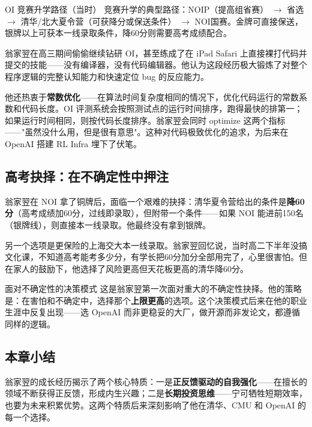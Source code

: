 \begin{knowledgebox}{OI 竞赛升学路径（当时）}
竞赛升学的典型路径：NOIP（提高组省赛） $\rightarrow$ 省选 $\rightarrow$ 清华/北大夏令营（可获降分或保送条件） $\rightarrow$ NOI国赛。金牌可直接保送，银牌以上可获本一线录取条件，降60分则需要高考成绩配合。
\end{knowledgebox}

翁家翌在高三期间偷偷继续钻研 OI，甚至练成了在 iPad Safari 上直接裸打代码并提交的技能——没有编译器，没有代码编辑器。他认为这段经历极大锻炼了对整个程序逻辑的完整认知能力和快速定位 bug 的反应能力。

他还热衷于\textbf{常数优化}——在算法时间复杂度相同的情况下，优化代码运行的常数系数和代码长度。OI 评测系统会按照测试点的运行时间排序，跑得最快的排第一；如果运行时间相同，则按代码长度排序。翁家翌会同时 optimize 这两个指标——"虽然没什么用，但是很有意思"。这种对代码极致优化的追求，为后来在 OpenAI 搭建 RL Infra 埋下了伏笔。

\subsection{高考抉择：在不确定性中押注}

翁家翌在 NOI 拿了铜牌后，面临一个艰难的抉择：清华夏令营给出的条件是\textbf{降60分}（高考成绩加60分，过线即录取），但附带一个条件——如果 NOI 能进前150名（银牌线），则直接本一线录取。他最终没有拿到银牌。

另一个选项是更保险的上海交大本一线录取。翁家翌回忆说，当时高二下半年没搞文化课，不知道高考能考多少分，有学长把60分加分全部用完了，心里很害怕。但在家人的鼓励下，他选择了风险更高但天花板更高的清华降60分。

\begin{warningbox}{面对不确定性的决策模式}
这是翁家翌第一次面对重大的不确定性抉择。他的策略是：在害怕和不确定中，选择那个\textbf{上限更高}的选项。这个决策模式后来在他的职业生涯中反复出现——选 OpenAI 而非更稳妥的大厂，做开源而非发论文，都遵循同样的逻辑。
\end{warningbox}

\subsection{本章小结}

翁家翌的成长经历揭示了两个核心特质：一是\textbf{正反馈驱动的自我强化}——在擅长的领域不断获得正反馈，形成内生兴趣；二是\textbf{长期投资思维}——宁可牺牲短期效率，也要为未来积累优势。这两个特质后来深刻影响了他在清华、CMU 和 OpenAI 的每一个选择。


